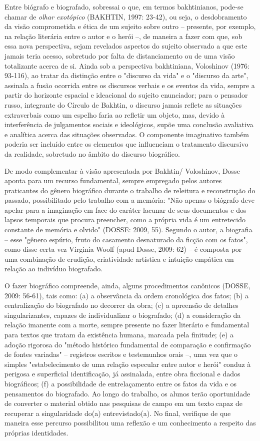 \documentclass[11pt]{extarticle}
\begin{document}
Entre biógrafo e biografado, sobressai o que, em termos bakhtinianos,
pode-se chamar de \emph{olhar exotópico} (BAKHTIN, 1997: 23-42), ou
seja, o desdobramento da visão comprometida e ética de um sujeito sobre
outro -- presente, por exemplo, na relação literária entre o autor e o
herói --, de maneira a fazer com que, sob essa nova perspectiva, sejam
revelados aspectos do sujeito observado a que este jamais teria acesso,
sobretudo por falta de distanciamento ou de uma visão totalizante acerca
de si. Ainda sob a perspectiva bakhtiniana, Voloshinov (1976: 93-116),
ao tratar da distinção entre o "discurso da vida" e o "discurso da
arte", assinala a fusão ocorrida entre os discursos verbais e os eventos
da vida, sempre a partir do horizonte espacial e ideacional do sujeito
enunciador; para o pensador russo, integrante do Círculo de Bakhtin, o
discurso jamais reflete as situações extraverbais como um espelho faria
ao refletir um objeto, mas, devido à interferência de julgamentos
sociais e ideológicos, supõe uma conclusão avaliativa e analítica acerca
das situações observadas. O componente imaginativo também poderia ser
incluído entre os elementos que influenciam o tratamento discursivo da
realidade, sobretudo no âmbito do discurso biográfico.

De modo complementar à visão apresentada por Bakhtin/ Voloshinov, Dosse
aponta para um recurso fundamental, sempre empregado pelos autores
praticantes do gênero biográfico durante o trabalho de releitura e
reconstrução do passado, possibilitado pelo trabalho com a memória: "Não
apenas o biógrafo deve apelar para a imaginação em face do caráter
lacunar de seus documentos e dos lapsos temporais que procura preencher,
como a própria vida é um entretecido constante de memória e olvido"
(DOSSE: 2009, 55). Segundo o autor, a biografia -- esse "gênero espúrio,
fruto do casamento desnaturado da ficção com os fatos", como disse certa
vez Virginia Woolf (apud Dosse, 2009: 62) -- é composta por uma
combinação de erudição, criatividade artística e intuição empática em
relação ao indivíduo biografado.

O fazer biográfico compreende, ainda, alguns procedimentos canônicos
(DOSSE, 2009: 56-61), tais como: (a) a observância da ordem cronológica
dos fatos; (b) a centralização do biografado no decorrer da obra; (c) a
apreensão de detalhes singularizantes, capazes de individualizar o
biografado; (d) a consideração da relação imanente com a morte, sempre
presente no fazer literário e fundamental para textos que tratam da
existência humana, marcada pela finitude; (e) a adoção rigorosa do
"método histórico fundamental de comparação e confirmação de fontes
variadas" -- registros escritos e testemunhos orais --, uma vez que o
simples "estabelecimento de uma relação especular entre autor e herói"
conduz à perigosa e superficial identificação, já assinalada, entre obra
ficcional e dados biográficos; (f) a possibilidade de entrelaçamento
entre os fatos da vida e os pensamentos do biografado. Ao longo do
trabalho, os alunos terão oportunidade de converter o material obtido
nas pesquisas de campo em um texto capaz de recuperar a singularidade
do(a) entrevistado(a). No final, verifique de que maneira esse percurso
possibilitou uma reflexão e um conhecimento a respeito das próprias
identidades.
\end{document}
